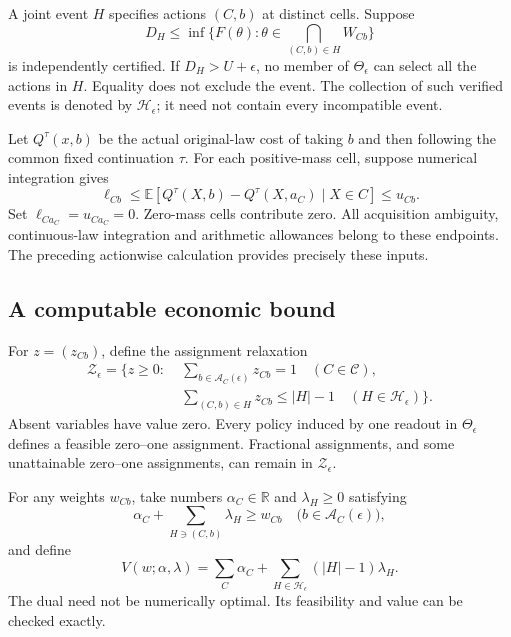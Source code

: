 A joint event $H$ specifies actions $(C,b)$ at distinct cells. Suppose
\[
 D_H\le\inf\{F(\theta):\theta\in\bigcap_{(C,b)\in H}W_{Cb}\}
\]
is independently certified. If $D_H>U+\epsilon$, no member of $\Theta_\epsilon$ can select all the actions in $H$. Equality does not exclude the event. The collection of such verified events is denoted by $\mathcal H_\epsilon$; it need not contain every incompatible event.

Let $Q^\tau(x,b)$ be the actual original-law cost of taking $b$ and then following the common fixed continuation $\tau$. For each positive-mass cell, suppose numerical integration gives
\begin{equation}\label{eq:conditional-cost84}
 \ell_{Cb}\le
 \mathbb E[Q^\tau(X,b)-Q^\tau(X,a_C)\mid X\in C]
 \le u_{Cb}.
\end{equation}
Set $\ell_{Ca_C}=u_{Ca_C}=0$. Zero-mass cells contribute zero. All acquisition ambiguity, continuous-law integration and arithmetic allowances belong to these endpoints. The preceding actionwise calculation provides precisely these inputs.

\subsection{A computable economic bound}
For $z=(z_{Cb})$, define the assignment relaxation
\begin{equation}\label{eq:assignment84}
 \begin{split}
 \mathcal Z_\epsilon=\bigg\{z\ge0:\;&
 \sum_{b\in\mathcal A_C(\epsilon)}z_{Cb}=1\quad(C\in\mathcal C),\\
 &\sum_{(C,b)\in H}z_{Cb}\le |H|-1
                       \quad(H\in\mathcal H_\epsilon)\bigg\}.
 \end{split}
\end{equation}
Absent variables have value zero. Every policy induced by one readout in $\Theta_\epsilon$ defines a feasible zero--one assignment. Fractional assignments, and some unattainable zero--one assignments, can remain in $\mathcal Z_\epsilon$.

For any weights $w_{Cb}$, take numbers $\alpha_C\in\mathbb R$ and $\lambda_H\ge0$ satisfying
\begin{equation}\label{eq:assignment-dual84}
 \alpha_C+\sum_{H\ni(C,b)}\lambda_H\ge w_{Cb}
              \quad\bigl(b\in\mathcal A_C(\epsilon)\bigr),
\end{equation}
and define
\[
 V(w;\alpha,\lambda)=\sum_C\alpha_C+
                      \sum_{H\in\mathcal H_\epsilon}(|H|-1)\lambda_H.
\]
The dual need not be numerically optimal. Its feasibility and value can be checked exactly.

